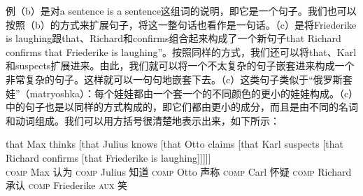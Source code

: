 例（b）是对a sentence is a sentence这组词的说明，即它是一个句子。我们也可以按照（b）的方式来扩展句子，将这一整句话也看作是一句话。（c）是将Friederike is laughing跟that、Richard和confirms组合起来构成了一个新句子that Richard confirms that Friederike is laughing”。按照同样的方式，我们还可以将that、Karl和suspects扩展进来。由此，我们就可以将一个不太复杂的句子嵌套进来构成一个非常复杂的句子。这样就可以一句句地嵌套下去。（c）这类句子类似于“俄罗斯套娃”（matryoshka）：每个娃娃都由一个套一个的不同颜色的更小的娃娃构成。（c）中的句子也是以同样的方式构成的，即它们都由更小的成分，而且是由不同的名词和动词组成。我们可以用方括号很清楚地表示出来，如下所示：

\ea
\label{ex-that-max-thinks-that-recursion}
\gll that          Max thinks [that                 Julius knows [that Otto claims [that Karl suspects [that Richard confirms [that Friederike is laughing]]]]]\\
     \textsc{comp} Max 认为    \spacebr\textsc{comp} Julius 知道  \spacebr\textsc{comp} Otto 声称 \spacebr\textsc{comp} Carl 怀疑 \spacebr\textsc{comp} Richard 承认 \spacebr\textsc{comp} Friederike \textsc{aux} 笑\\
\z

